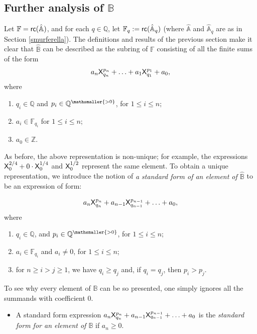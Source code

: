 \documentclass{amsart}
\renewcommand{\leq}{\leqslant}
\renewcommand{\geq}{\geqslant}
\newcommand{\X}{{\sf X}}
\newcommand{\rc}{{\sf rc}}
\begin{document}
\subsection{Further analysis of $\mathbb{B}$ } \label{subsection_on_further-analysis_of_B}
Let $\mathbb{F} = \rc(\hat{\mathbb{A}})$, and for each $q\in \mathbb{Q}$, let $\mathbb{F}_{q}:=\rc(\hat{\mathbb{A}}_q)$ (where $\mathbb{\hat{A}}$ and 
$\mathbb{\hat{A}}_{q}$ are as in Section \ref{smurferella}). The definitions and results of the previous section make it clear that 
$\hat{\mathbb{B}}$ can be described as the subring of $\mathbb{F}$ consisting of all the finite sums of the form $$a_n\X_{q_n}^{p_n}+\ldots+a_1\X_{q_1}^{p_1}+a_0,$$
where
\begin{enumerate}[$1$.]
    \item $q_i\in\mathbb{Q}$ and $p_i\in\mathbb{Q}^{\mathsmaller{> 0}}$, for $1\leq i \leq n;$
    \item $a_i \in \mathbb{F}_{q_i}$ for $1\leq i \leq n$;
    \item $a_0 \in \mathbb{Z}$.
\end{enumerate}
As before, the above representation is non-unique; for example, the expressions $\X_0^{2/4} + 0\cdot\X_0^{1/4}$ and $\X_0^{1/2}$ 
represent the same element. To obtain a unique representation, we introduce the notion of \emph{a standard form of an element of $\hat{\mathbb{B}}$} to be an expression of  form:
 
\begin{equation*}\label{QS_SF}
    a_n\X_{q_n}^{p_n} + a_{n-1}\X^{p_{n-1}}_{q_{n-1}} + \ldots + a_0,
\end{equation*}
where
\begin{enumerate}[$1$.]
\item 
$q_i\in \mathbb{Q}$, and $p_i\in \mathbb{Q}^{\mathsmaller{> 0}}$, for $1\leq i\leq n$;
\item 
$a_i\in \mathbb{F}_{q_i}$ and $a_i \neq 0$, for $1\leq i\leq n$;
\item 
for $n \geq i>j \geq 1$, we have $q_i\geq q_j$ and, if $q_i = q_j$, then $p_i>p_j$.
\end{enumerate}

To see why every element of $\mathbb{B}$ can be so presented, one simply ignores all the summands with coefficient $0$.

\begin{itemize}
    \item A standard form expression   $a_n\X_{q_n}^{p_n} + a_{n-1}\X^{p_{n-1}}_{q_{n-1}} + \ldots + a_0$ is the \emph{standard form for an element of $\mathbb{B}$} if $a_n\geq 0.$
\end{itemize}
\end{document}
